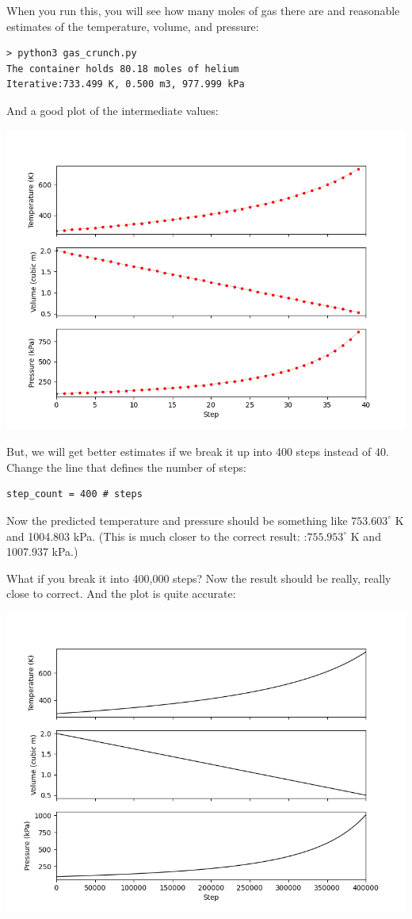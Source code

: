 When you run this,  you will see how many moles of gas there are and reasonable estimates of the temperature,  volume,  and pressure:

\begin{Verbatim}
> python3 gas_crunch.py            
The container holds 80.18 moles of helium
Iterative:733.499 K, 0.500 m3, 977.999 kPa
\end{Verbatim}

And a good plot of the intermediate values:

\includegraphics[width=\textwidth]{chunkplot1.png}

But, we will get better estimates if we break it up into 400 steps instead of 40.    Change the line that defines the number of steps:

\begin{Verbatim}
step_count = 400 # steps
\end{Verbatim}

Now the predicted temperature and pressure should be something like $753.603^\circ$  K and 1004.803 kPa.   (This is much closer to the correct result: :$755.953^\circ$ K and 1007.937 kPa.)

What if you break it into 400,000 steps?  Now the result should be really, really close to correct.  And the plot is quite accurate:

\includegraphics[width=\textwidth]{chunkplot2.png}


